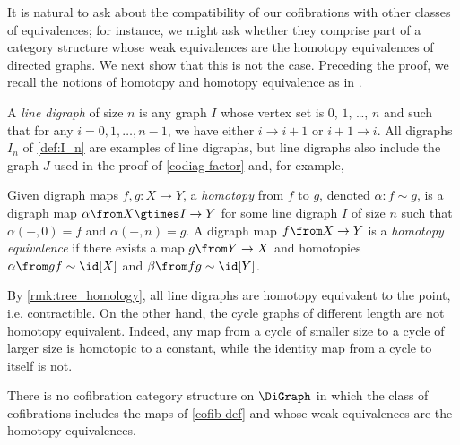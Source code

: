 It is natural to ask about the compatibility of our cofibrations with other classes of equivalences; for instance, we might ask whether they comprise part of a category structure whose weak equivalences are the homotopy equivalences of directed graphs. 
We next show that this is not the case. Preceding the proof, we recall the notions of homotopy and homotopy equivalence as in \cite{grigor'yan-lin-muranov-yau:homotopy}.

A \emph{line digraph} of size $n$ is any graph $I$ whose vertex set is $0$, $1$, \ldots, $n$ and such that for any $i = 0, 1, \ldots, n-1$, we have either $i \to i+1$ or $i+1 \to i$.
All digraphs $I_n$ of \cref{def:I_n} are examples of line digraphs, but line digraphs also include the graph $J$ used in the proof of \cref{codiag-factor} and, for example,
    \begin{figure}[H]
    \centering
    \end{figure}
Given digraph maps $f, g \colon X \to Y$, a \emph{homotopy} from $f$ to $g$, denoted $\alpha \colon f \sim g$, is a digraph map $\alpha \from X \gtimes I \to Y$ for some line digraph $I$ of size $n$ such that $\alpha(-, 0) = f$ and $\alpha(-, n) = g$.
A digraph map $f \from X \to Y$ is a \emph{homotopy equivalence} if there exists a map $g \from Y \to X$ and homotopies $\alpha \from gf \sim \id[X]$ and $\beta \from fg \sim \id[Y]$.

By \cref{rmk:tree_homology}, all line digraphs are homotopy equivalent to the point, i.e.  contractible.
On the other hand, the cycle graphs of different length are not homotopy equivalent.
Indeed, any map from a cycle of smaller size to a cycle of larger size is homotopic to a constant, while the identity map from a cycle to itself is not.

\begin{proposition}
There is no cofibration category structure on $\DiGraph$ in which the class of cofibrations includes the maps of \cref{cofib-def} and whose weak equivalences are the homotopy equivalences.
\end{proposition}

